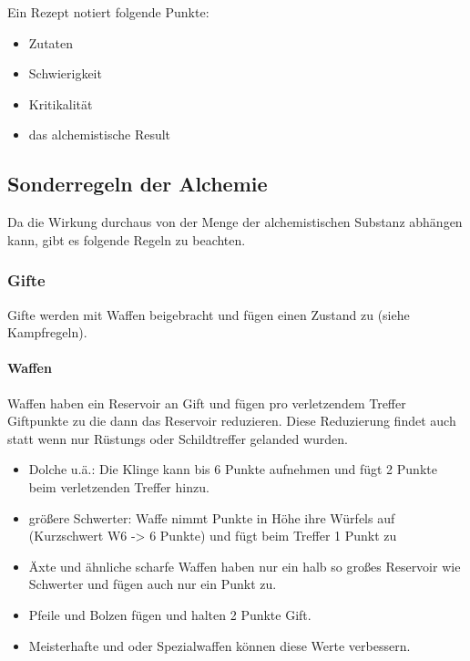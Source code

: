 \documentclass{article}
\begin{document}
Ein Rezept notiert folgende Punkte:

\begin{itemize}
\item Zutaten
\item Schwierigkeit
\item Kritikalität
\item das alchemistische Result
\end{itemize}

\begin{center}
\subsection{Sonderregeln der Alchemie}
\end{center}

Da die Wirkung durchaus von der Menge der alchemistischen Substanz abhängen kann, gibt es folgende Regeln zu beachten.

\subsubsection{Gifte}

Gifte werden mit Waffen beigebracht und fügen einen Zustand zu (siehe Kampfregeln).

\paragraph{Waffen}

Waffen haben ein Reservoir an Gift und fügen pro verletzendem Treffer Giftpunkte zu die dann das Reservoir reduzieren.
Diese Reduzierung findet auch statt wenn nur Rüstungs oder Schildtreffer gelanded wurden.

\begin{itemize}
\item Dolche u.ä.: Die Klinge kann bis 6 Punkte aufnehmen und fügt 2 Punkte beim verletzenden Treffer hinzu.
\item größere Schwerter: Waffe nimmt Punkte in Höhe ihre Würfels auf (Kurzschwert W6 -> 6 Punkte) und fügt beim Treffer 1 Punkt zu
\item Äxte und ähnliche scharfe Waffen haben nur ein halb so großes Reservoir wie Schwerter und fügen auch nur ein Punkt zu.
\item Pfeile und Bolzen fügen und halten 2 Punkte Gift.
\item Meisterhafte und oder Spezialwaffen können diese Werte verbessern.
\end{itemize}
\end{document}
